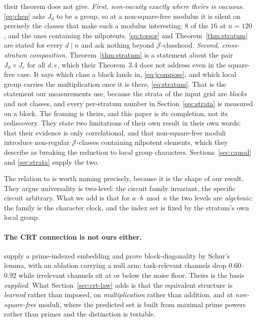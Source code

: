 their theorem does not give. \emph{First, non-vacuity exactly where theirs is vacuous.}
\eqref{eq:chen} asks $J_{d}$ to be a group, so at a non-square-free modulus it is silent on
precisely the classes that make such a modulus interesting: $8$ of the $16$ at $n = 120$,
and the ones containing the nilpotents. \eqref{eq:torsor} and Theorem~\ref{thm:stratum}
are stated for every $d \mid n$ and ask nothing beyond $\mathcal{J}$-classhood. \emph{Second, cross-stratum composition.}
Theorem~\ref{thm:stratum} is a statement about the pair $J_{d} \times J_{e}$ for all
$d, e$, which their Theorem~3.4 does not address even in the square-free case. It says which
class a block lands in, \eqref{eq:jcompose}, and which local group carries the
multiplication once it is there, \eqref{eq:stratum}. That is the statement our
measurements use, because the strata of the input grid are \emph{blocks} and not
classes, and every per-stratum number in Section~\ref{sec:strata} is measured on a block.
The framing is theirs, and this
paper is its completion, not its rediscovery. They state two limitations of their own result in their own
words: that their evidence is only correlational, and that non-square-free moduli introduce
non-regular $\mathcal{J}$-classes containing nilpotent elements, which they describe as
breaking the reduction to local group characters. Sections~\ref{sec:causal} and
\ref{sec:strata} supply the two.

The relation to \citet{chughtai2023toy} is worth naming precisely, because it is the shape of
our result. They argue universality is two-level: the circuit family invariant, the specific
circuit arbitrary. What we add is that for $a \cdot b \bmod n$ the two levels are
\emph{algebraic}: the family is the character clock, and the index set is fixed by the
stratum's own local group.

\paragraph{The CRT connection is not ours either.} \citet{hwang2026pfe} supply a
prime-indexed embedding and prove block-diagonality by Schur's lemma, with an ablation carrying
a null arm: task-relevant channels drop $0.60$--$0.92$ while irrelevant channels sit at or
below the noise floor. Theirs is the basis \emph{supplied}. What Section~\ref{sec:crt-law}
adds is that the equivalent structure is \emph{learned} rather than imposed, on
\emph{multiplication} rather than addition, and at \emph{non-square-free} moduli, where the
predicted set is built from maximal prime powers rather than primes and the distinction is
testable.
